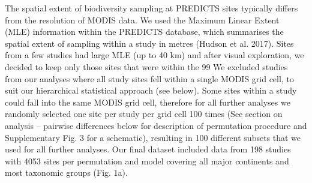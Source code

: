 {	The spatial extent of biodiversity sampling at PREDICTS sites typically differs from the resolution of MODIS data. We used the Maximum Linear Extent (MLE) information within the PREDICTS database, which summarises the spatial extent of sampling within a study in metres (Hudson et al. 2017). Sites from a few studies had large MLE (up to 40 km) and after visual exploration, we decided to keep only those sites that were within the 99 %
We excluded studies from our analyses where all study sites fell within a single MODIS grid cell, to suit our hierarchical statistical approach (see below). Some sites within a study could fall into the same MODIS grid cell, therefore for all further analyses we randomly selected one site per study per grid cell 100 times (See section on analysis – pairwise differences below for description of permutation procedure and Supplementary Fig. 3 for a schematic), resulting in 100 different subsets that we used for all further analyses. Our final dataset included data from 198 studies with 4053 sites per permutation and model covering all major continents and most taxonomic groups (Fig. 1a).

}
